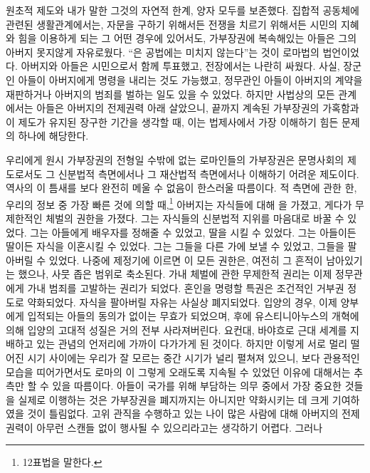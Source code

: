 원초적 제도와 내가 말한 그것의 자연적 한계, 양자 모두를 보존했다.
집합적 공동체에 관련된 생활관계에서는,
자문을 구하기 위해서든 전쟁을 치르기 위해서든
시민의 지혜와 힘을 이용하게 되는 그 어떤 경우에 있어서도,
가부장권에 복속해있는 아들은 그의 아버지 못지않게
자유로웠다.
``은 공법에는 미치지
않는다''는 것이 로마법의 법언이었다.
아버지와 아들은 시민으로서 함께 투표했고, 전장에서는 나란히 싸웠다.
사실, 장군인 아들이 아버지에게 명령을 내리는 것도 가능했고,
정무관인 아들이 아버지의 계약을 재판하거나
아버지의 범죄를 벌하는 일도 있을 수 있었다.
하지만 사법상의 모든 관계에서는
아들은 아버지의 전제권력 아래 살았으니,
끝까지 계속된 가부장권의 가혹함과
이 제도가 유지된 장구한 기간을 생각할 때,
이는 법제사에서 가장 이해하기 힘든 문제의 하나에 해당한다.

우리에게 원시 가부장권의 전형일 수밖에 없는
로마인들의 가부장권은
문명사회의 제도로서도
그 신분법적 측면에서나 그 재산법적 측면에서나
이해하기 어려운 제도이다.
역사의 이 틈새를 보다 완전히 메울 수 없음이 한스러울 따름이다.
적 측면에 관한 한,
우리의 정보 중 가장 빠른 것에 의할 때,\footnote{12표법을 말한다.}
아버지는 자식들에 대해 을 가졌고,
게다가 무제한적인 체벌의 권한을 가졌다.
그는 자식들의 신분법적 지위를 마음대로 바꿀 수 있었다.
그는 아들에게 배우자를 정해줄 수 있었고, 딸을 시킬 수 있었다.
그는 아들이든 딸이든 자식을 이혼시킬 수 있었다.
그는 그들을 다른 가에 보낼 수 있었고, 그들을 팔아버릴 수 있었다.
나중에 제정기에 이르면 이 모든 권한은, 여전히 그 흔적이 남아있기는 했으나,
사뭇 좁은 범위로 축소된다.
가내 체벌에 관한 무제한적 권리는 이제
정무관에게 가내 범죄를 고발하는 권리가 되었다.
혼인을 명령할 특권은 조건적인 거부권 정도로 약화되었다.
자식을 팔아버릴 자유는 사실상 폐지되었다.
입양의 경우, 이제 양부에게 입적되는 아들의 동의가 없이는
무효가 되었으며, 후에 유스티니아누스의 개혁에 의해
입양의 고대적 성질은 거의 전부 사라져버린다.
요컨대, 바야흐로 근대 세계를 지배하고 있는 관념의 언저리에
가까이 다가가게 된 것이다.
하지만 이렇게 서로 멀리 떨어진 시기 사이에는 우리가 잘 모르는
중간 시기가 널리 펼쳐져 있으니,
보다 관용적인 모습을 띠어가면서도
로마의 이
그렇게 오래도록 지속될 수 있었던
이유에 대해서는 추측만 할 수 있을 따름이다.
아들이 국가를 위해 부담하는 의무 중에서 가장 중요한 것들을
실제로 이행하는 것은 가부장권을 폐지까지는 아니지만 약화시키는 데
크게 기여하였을 것이 틀림없다.
고위 관직을 수행하고 있는 나이 많은 사람에 대해
아버지의 전제 권력이 아무런 스캔들 없이 행사될 수 있으리라고는
생각하기 어렵다.
그러나
